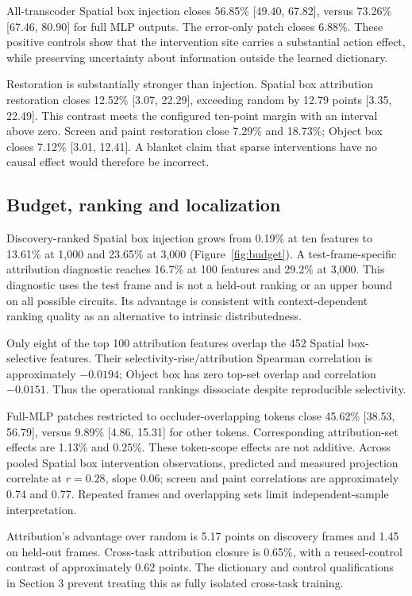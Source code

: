 \documentclass{article}
\begin{document}
All-transcoder Spatial box injection closes 56.85\% [49.40, 67.82], versus 73.26\% [67.46, 80.90] for full MLP outputs. The error-only patch closes 6.88\%. These positive controls show that the intervention site carries a substantial action effect, while preserving uncertainty about information outside the learned dictionary.

Restoration is substantially stronger than injection. Spatial box attribution restoration closes 12.52\% [3.07, 22.29], exceeding random by 12.79 points [3.35, 22.49]. This contrast meets the configured ten-point margin with an interval above zero. Screen and paint restoration close 7.29\% and 18.73\%; Object box closes 7.12\% [3.01, 12.41]. A blanket claim that sparse interventions have no causal effect would therefore be incorrect.

\subsection{Budget, ranking and localization}
Discovery-ranked Spatial box injection grows from 0.19\% at ten features to 13.61\% at 1,000 and 23.65\% at 3,000 (Figure~\ref{fig:budget}). A test-frame-specific attribution diagnostic reaches 16.7\% at 100 features and 29.2\% at 3,000. This diagnostic uses the test frame and is not a held-out ranking or an upper bound on all possible circuits. Its advantage is consistent with context-dependent ranking quality as an alternative to intrinsic distributedness.

Only eight of the top 100 attribution features overlap the 452 Spatial box-selective features. Their selectivity-rise/attribution Spearman correlation is approximately $-0.0194$; Object box has zero top-set overlap and correlation $-0.0151$. Thus the operational rankings dissociate despite reproducible selectivity.

Full-MLP patches restricted to occluder-overlapping tokens close 45.62\% [38.53, 56.79], versus 9.89\% [4.86, 15.31] for other tokens. Corresponding attribution-set effects are 1.13\% and 0.25\%. These token-scope effects are not additive. Across pooled Spatial box intervention observations, predicted and measured projection correlate at $r=0.28$, slope 0.06; screen and paint correlations are approximately 0.74 and 0.77. Repeated frames and overlapping sets limit independent-sample interpretation.

Attribution's advantage over random is 5.17 points on discovery frames and 1.45 on held-out frames. Cross-task attribution closure is 0.65\%, with a reused-control contrast of approximately 0.62 points. The dictionary and control qualifications in Section 3 prevent treating this as fully isolated cross-task training.
\end{document}
